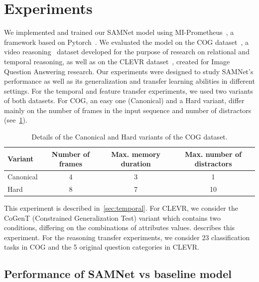 \section{Experiments}
\label{sec:experiments}
We implemented and trained our SAMNet model using MI-Prometheus~\cite{kornuta2018accelerating}, a framework based on Pytorch~\cite{paszke2017automatic}. We evaluated the model on the COG dataset~\cite{yang2018dataset}, a video reasoning~\cite{mogadala2019trends} dataset developed for the purpose of research on relational and temporal reasoning, as well as on the CLEVR dataset~\cite{johnson2017clevr}, created for Image Question Answering research.
Our experiments were designed to study SAMNet's performance as well as its generalization and transfer learning abilities in different settings.
For the temporal and feature transfer experiments, we used two variants of both datasets.
For COG, an easy one (Canonical) and a Hard variant, differ mainly on the number of frames in the input sequence and number of 
distractors (see~\cref{tab:cog_variants}).
\begin{table}[ht]
	\centering
	\begin{adjustbox}{width=0.45\textwidth}
		\begin{tabular}{lccc}
			\toprule
			Variant	&	Number of frames	&	Max. memory duration	&	Max. number of distractors \\ 
			\midrule
			Canonical & 4 & 3 & 1\\	
			Hard  & 8 & 7 & 10\\
			\bottomrule	
		\end{tabular}
	\end{adjustbox}
	\caption{Details of the Canonical and Hard variants of the COG dataset.}
	\label{tab:cog_variants}
\end{table}
This experiment is described in~\cref{sec:temporal}.
For CLEVR, we consider the CoGenT (Constrained Generalization Test) variant which contains two conditions, differing on the combinations of attributes values.
 describes this experiment.
For the reasoning transfer experiments, we consider 23 classification tasks in COG and the 5 original question categories in CLEVR.

\subsection{Performance of SAMNet vs baseline model~\cite{yang2018dataset}}
\label{sec:cog-baseline-compare}

